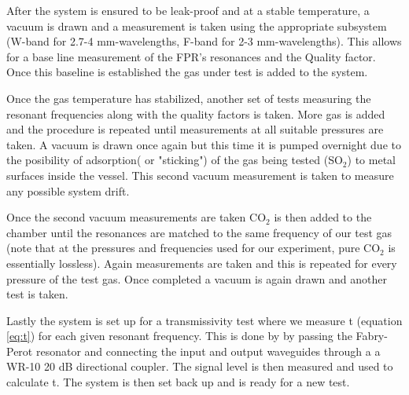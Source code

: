 After the system is ensured to be leak-proof and at a stable temperature, a vacuum is drawn and a measurement is taken using the appropriate subsystem (W-band for 2.7-4 mm-wavelengths, F-band for 2-3 mm-wavelengths). This allows for a base line measurement of the FPR's resonances and the Quality factor. Once this baseline is established the gas under test is added to the system.

Once the gas temperature has stabilized, another set of tests measuring the resonant frequencies along with the quality factors is taken. More gas is added and the procedure is repeated until measurements at all suitable pressures are taken. A vacuum is drawn once again but this time it is pumped overnight due to the posibility of adsorption( or "sticking") of the gas being tested (SO$_2$) to metal surfaces inside the vessel. This second vacuum measurement is taken to measure any possible system drift.

Once the second vacuum measurements are taken CO$_2$ is then added to the chamber until the resonances are matched to the same frequency of our test gas (note that at the pressures and frequencies used for our experiment, pure CO$_2$ is essentially lossless). Again measurements are taken and this is repeated for every pressure of the test gas. Once completed a vacuum is again drawn and another test is taken. 

Lastly the system is set up for a transmissivity test where we measure t (equation \ref{eq:t}) for each given resonant frequency. This is done by by passing the Fabry-Perot resonator and connecting the input and output waveguides through a a WR-10 20 dB directional coupler. The signal level is then measured and used to calculate t.  The system is then set back up and is ready for a new test. %

